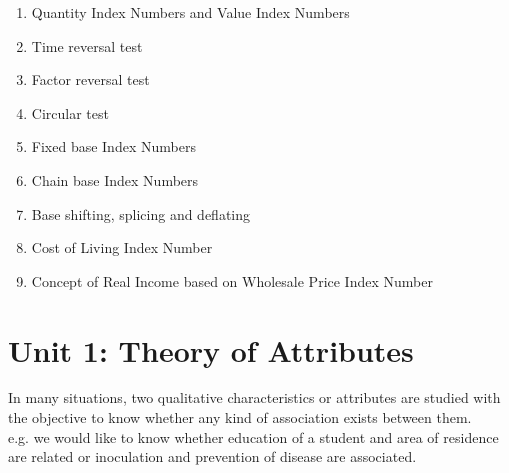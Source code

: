 \documentclass[
10pt, %
a4paper, %
]{report}
\begin{document}
\begin{itemize}
\begin{enumerate}
\begin{itemize}
\end{itemize} 
\item Quantity Index Numbers and Value Index Numbers
\item Time reversal test
\item Factor reversal test
\item Circular test
\item Fixed base Index Numbers
\item Chain base Index Numbers
\item Base shifting, splicing and deflating
\item Cost of Living Index Number
\item Concept of Real Income based on Wholesale Price Index Number
\end{enumerate}
\end{itemize}

\chapter{Unit 1: Theory of Attributes}

In many situations, two qualitative characteristics or attributes are studied with the objective to know whether any kind of association exists between them. \\
e.g. we would like to know whether education of a student and area of residence are related or inoculation and prevention of disease are associated.
\end{document}
